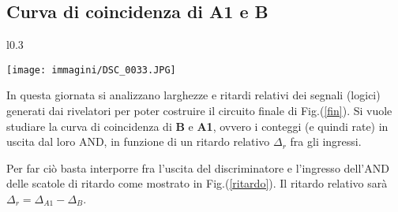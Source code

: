 \documentclass[12pt,a4paper,openright,twoside]{article}
\numberwithin{equation}{section} %
\begin{document}
\subsection{Curva di coincidenza di A1 e B} \label{coinc}

\begin{wrapfigure}{l}{0.3\textwidth}
\begin{center}
\texttt{[image: immagini/DSC\_0033.JPG]}
\caption{Linee di ritardo per \textbf{B} e \textbf{A1}}
\label{ritardo}
\end{center}
\end{wrapfigure}

In questa giornata si analizzano larghezze e ritardi relativi dei segnali (logici) generati dai rivelatori per poter costruire il circuito finale di Fig.(\ref{fin}). Si vuole studiare la curva di coincidenza di \textbf{B} e \textbf{A1}, ovvero i conteggi (e quindi rate) in uscita dal loro AND, in funzione di un ritardo relativo $\Delta_{r}$ fra gli ingressi.

Per far ciò basta interporre fra l'uscita del discriminatore e l'ingresso dell'AND delle scatole di ritardo come mostrato in Fig.(\ref{ritardo}). Il ritardo relativo  sarà $\Delta_{r}=\Delta_{A1} - \Delta_{B}$. 
\end{document}
